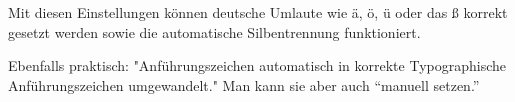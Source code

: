 \documentclass{article}
\begin{document}
Mit diesen Einstellungen können deutsche Umlaute wie ä, ö, ü oder das ß korrekt
gesetzt werden sowie die automatische Silbentrennung funktioniert.

Ebenfalls praktisch: "Anführungszeichen automatisch in korrekte Typographische
Anführungszeichen umgewandelt." Man kann sie aber auch \enquote{manuell
setzen.}
\end{document}
